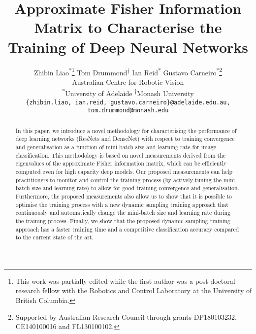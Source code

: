 \documentclass[10pt,journal,compsoc]{IEEEtran}
\newenvironment{DIFnomarkup}{}{}
\begin{document}
\title{Approximate Fisher Information Matrix to Characterise the Training of Deep Neural Networks}

\begin{DIFnomarkup}
\author{Zhibin Liao\textsuperscript{*}\thanks{This work was partially edited while the first author was a post-doctoral research fellow with the Robotics and Control Laboratory at the University of British Columbia.}  \quad Tom Drummond\textsuperscript{$\dagger$}  \quad Ian Reid\textsuperscript{*} \quad Gustavo Carneiro\textsuperscript{*}\thanks{Supported by Australian Research Council through grants DP180103232, CE140100016 and FL130100102.}\\
Australian Centre for Robotic Vision\\
\textsuperscript{*}University of Adelaide \qquad \textsuperscript{$\dagger$}Monash University\\
{\tt\small \{zhibin.liao, ian.reid, gustavo.carneiro\}@adelaide.edu.au, tom.drummond@monash.edu}
}
\end{DIFnomarkup}

\maketitle

\newcommand{\note}[1]{\textcolor{red}{#1}}

\begin{abstract}

In this paper, we introduce a novel methodology for characterising the performance of deep learning networks (ResNets and DenseNet) with respect to training convergence and generalisation as a function of mini-batch size and learning rate for image classification.  
This methodology is based on novel measurements derived from the eigenvalues of the approximate Fisher information matrix, which can be efficiently computed even for high capacity deep models. %
Our proposed measurements can help practitioners to monitor and control the training process (by actively tuning the mini-batch size and learning rate) to allow for good training convergence and generalisation.
Furthermore, the proposed measurements also allow us to show that it is possible to optimise the training process with a new dynamic sampling training approach that continuously and automatically change the mini-batch size and learning rate during the training process. Finally, we show that the proposed dynamic sampling training approach has a faster training time and a competitive classification accuracy compared to the current state of the art. 

\end{abstract}
\end{document}
